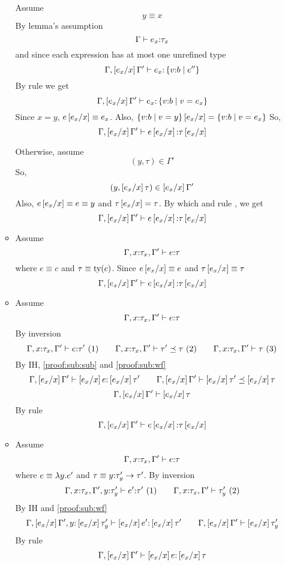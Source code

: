 \begin{enumerate}
\begin{itemize}
Assume
$$y \equiv x$$
By lemma's assumption 
$$\hastype{\Gamma}{e_x}{\tau_x}$$
and since each expression has at most one unrefined type
$$\hastype{\Gamma,\sub{x}{e_x}\Gamma'}{e_x}{\tref{v}{b}{e''}}$$
By rule \rtexact we get
$$\hastype{\Gamma,\sub{x}{e_x}\Gamma'}{e_x}{\tref{v}{b}{v = e_x}}$$
Since $x = y$, $e\sub{x}{e_x} \equiv e_x$.
Also, $\tref{v}{b}{v=y}\sub{x}{e_x}=\tref{v}{b}{v = e_x}$ 
So,
$$\hastype{\Gamma,\sub{x}{e_x}\Gamma'}{e\sub{x}{e_x}}{\tau\sub{x}{e_x}}$$

Otherwise, assume
$$(y,\tau)\in \Gamma'$$
So,
$$(y,\sub{x}{e_x}\tau)\in \sub{x}{e_x}\Gamma'$$
Also, $e\sub{x}{e_x}\equiv e \equiv y$ and $\tau\sub{x}{e_x} =\tau$.
By which and rule \rtvar, we get
$$\hastype{\Gamma,\sub{x}{e_x}\Gamma'}{e\sub{x}{e_x}}{\tau\sub{x}{e_x}}$$

\item\rtconst
Assume 
	$$\hastype{\Gamma, x\colon\tau_x, \Gamma'}{e}{\tau}$$
where $e \equiv c$ and $\tau\equiv\ty{c}$.
Since $e\sub{x}{e_x} \equiv e$ and $\tau\sub{x}{e_x}\equiv\tau$
$$\hastype{\Gamma,\sub{x}{e_x}\Gamma'}{e\sub{x}{e_x}}{\tau\sub{x}{e_x}}$$

\item\rtsub
Assume 
	$$\hastype{\Gamma, x\colon\tau_x, \Gamma'}{e}{\tau}$$
By inversion
$$
\hastype{\Gamma, x\colon\tau_x, \Gamma'}{e}{\tau'}\ (1)\qquad
\issubtype{\Gamma, x\colon\tau_x, \Gamma'}{\tau'}{\tau} \ (2)\qquad
\iswellformed{\Gamma, x\colon\tau_x, \Gamma'}{\tau} \ (3)
$$
By IH, \ref{proof:sub:sub} and \ref{proof:sub:wf}
$$
\hastype{\Gamma, \sub{x}{e_x}\Gamma'}{\sub{x}{e_x}e}{\sub{x}{e_x}\tau'}\qquad
\issubtype{\Gamma, \sub{x}{e_x}\Gamma'}{\sub{x}{e_x}\tau'}{\sub{x}{e_x}\tau}
$$
$$
\iswellformed{\Gamma, \sub{x}{e_x}\Gamma'}{\sub{x}{e_x}\tau}
$$
By rule \rtsub
$$\hastype{\Gamma,\sub{x}{e_x}\Gamma'}{e\sub{x}{e_x}}{\tau\sub{x}{e_x}}$$
\item\rtfun
Assume
	$$\hastype{\Gamma, x\colon\tau_x, \Gamma'}{e}{\tau}$$
where $e\equiv\efun{y}{e'}$ and $\tau\equiv\tfun{y}{\tau'_y}{\tau'}$.
By inversion
	$$
	\hastype{\Gamma, x\colon\tau_x, \Gamma', y\colon\tau'_y}{e'}{\tau'}\ (1)\qquad
	\iswellformed{\Gamma, x\colon\tau_x, \Gamma'}{\tau'_y}\ (2)
	$$
By IH and \ref{proof:sub:wf}
	$$
	\hastype{\Gamma,\sub{x}{e_x} \Gamma', y\colon\sub{x}{e_x}\tau'_y}{\sub{x}{e_x}e'}{\sub{x}{e_x}\tau'} \qquad
	\iswellformed{\Gamma, \sub{x}{e_x}\Gamma'}{\sub{x}{e_x}\tau'_y}
	$$
	By rule \rtfun
	$$
	\hastype{\Gamma,\sub{x}{e_x} \Gamma'}{\sub{x}{e_x}e}{\sub{x}{e_x}\tau}
	$$
	

\end{itemize}
\end{enumerate}
